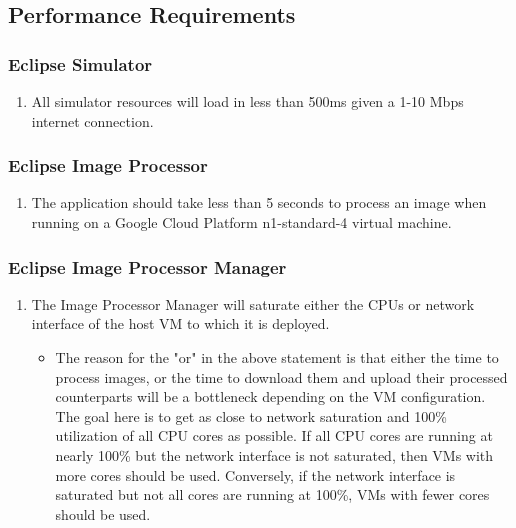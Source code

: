 \documentclass[10pt, onecolumn, draftclsnofoot, letterpaper, compsoc]{IEEEtran}
\begin{document}
\subsection{Performance Requirements}

\subsubsection{Eclipse Simulator}
	\begin{enumerate}
		\item All simulator resources will load in less than 500ms given a 1-10
		 Mbps internet connection.
	\end{enumerate}

\subsubsection{Eclipse Image Processor}
	\begin{enumerate}
		\item The application should take less than 5 seconds to process an
		 image when running on a Google Cloud Platform n1-standard-4 virtual
		 machine.
	\end{enumerate}

\subsubsection{Eclipse Image Processor Manager}
	\begin{enumerate}
		\item The Image Processor Manager will saturate either the CPUs or network interface of
		the host VM to which it is deployed. 
		\begin{itemize}
			\item The reason for the "or" in the above statement is that either the time to process 
			images, or the time to download them and upload their processed counterparts will be a 
			bottleneck depending on the VM configuration. The goal here is to get as close to network 
			saturation and 100\% utilization of all CPU cores as possible. If all CPU cores are running 
			at nearly 100\% but the network interface is not saturated, then VMs with more cores should 
			be used. Conversely, if the network interface is saturated but not all cores are running at 
			100\%, VMs with fewer cores should be used.
		\end{itemize}
	\end{enumerate}
\end{document}
